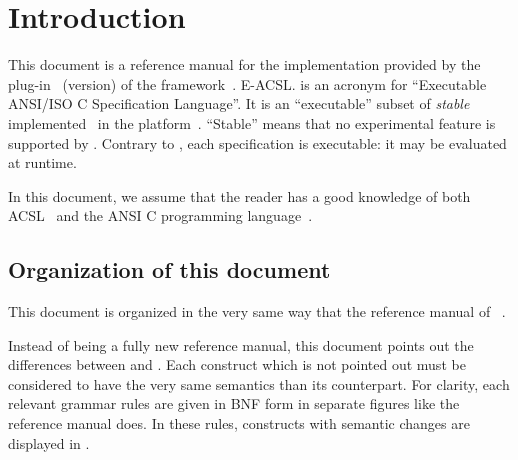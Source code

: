 \chapter{Introduction}

This document is a reference manual for
%
{the \eacsl implementation provided by the \eacsl plug-in~\cite{eacsl-plugin}
  (version\eacslversion) of the \framac framework~\cite{framac}.}%
{E-ACSL.}
\eacsl is an acronym for ``Executable ANSI/ISO C
Specification Language''. It is an ``executable'' subset of
\emph{stable} \acsl~\cite{acsl} implemented~\cite{acslimplem} in the \framac
platform~\cite{framac}. ``Stable'' means that no experimental \acsl feature is
supported by \eacsl. Contrary to \acsl, each \eacsl specification is
executable: it may be evaluated at runtime.

In this document, we assume that the reader has a good knowledge of both
ACSL~\cite{acsl} and the ANSI C programming language~\cite{standardc99,KR88}.

\section{Organization of this document}

This document is organized in the very same way that the reference manual of
\acsl~\cite{acsl}.

Instead of being a fully new reference manual, this document points out the
differences between \eacsl and \acsl. Each \eacsl construct which is not pointed
out must be considered to have the very same semantics than its \acsl
counterpart. For clarity, each relevant grammar rules are given in BNF form
in separate figures like the \acsl reference manual does. In these rules,
constructs with semantic changes are displayed in .

